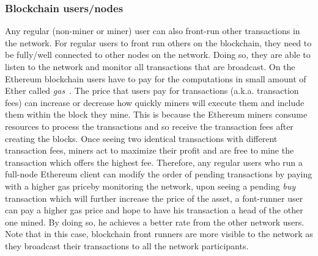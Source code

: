 \subsubsection{Blockchain users/nodes}
Any regular (non-miner or miner) user can also front-run other transactions in the network. For regular users to front run others on the blockchain, they need to be fully/well connected to other nodes on the network. Doing so, they are able to listen to the network and monitor all transactions that are broadcast. On the Ethereum blockchain users have to pay for the computations in small amount of Ether called \textit{gas}~\cite{AccountT67:online}. The price that users pay for transactions (a.k.a. transaction fees) can increase or decrease how quickly miners will execute them and include them within the block they mine. This is because the Ethereum miners consume resources to process the transactions and so receive the transaction fees after creating the blocks. Once seeing two identical transactions with different transaction fees, 
miners act to maximize their profit and are free to mine the transaction which offers the highest fee. Therefore, any regular users who run a full-node Ethereum client can modify the order of pending transactions by paying with a higher gas price\ie by monitoring the network, upon seeing a  pending \textit{buy} transaction which will further increase the price of the asset, a font-runner user can pay a higher gas price and hope to have his transaction a head of the other one mined. By doing so, he achieves a better rate from the other network users. Note that in this case, blockchain front runners are more visible to the network as they broadcast their transactions to all the network participants. 


